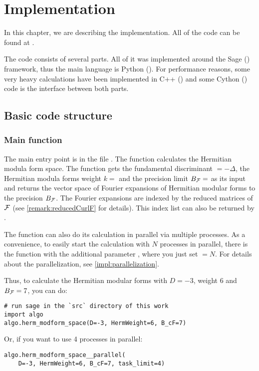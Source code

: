 
\section{Implementation}

In this chapter, we are describing the implementation. All of the code can be found at \cite{Zeyer13Github}.

The code consists of several parts.
All of it was implemented around the Sage (\cite{sage}) framework, thus the main language is Python (\cite{python}).
For performance reasons, some very heavy calculations have been implemented in C++ (\cite{cpp}) and some Cython (\cite{cython}) code is the interface between both parts.

\subsection{Basic code structure}

\subsubsection{Main function }
The main entry point is in the file .
The function  calculates the Hermitian modula form space.
The function gets the fundamental discriminant  $= - \Delta$, the Hermitian modula forms weight $k =$  and the precision limit $B_{\mathcal{F}} =$  as its input and returns the vector space of Fourier expansions of Hermitian modular forms to the precision $B_{\mathcal{F}}$. The Fourier expansions are indexed by the reduced matrices of $\mathcal{F}$ (see \cref{remark:reducedCurlF} for details). This index list can also be returned by .

The function can also do its calculation in parallel via multiple processes. As a convenience, to easily start the calculation with $N$ processes in parallel, there is the function  with the additional parameter , where you just set  $=N$. For details about the parallelization, see \cref{impl:parallelization}.

Thus, to calculate the Hermitian modular forms with $D=-3$, weight $6$ and $B_{\mathcal{F}} = 7$, you can do:
\begin{lstlisting}
# run sage in the `src` directory of this work
import algo
algo.herm_modform_space(D=-3, HermWeight=6, B_cF=7)
\end{lstlisting}
Or, if you want to use 4 processes in parallel:
\begin{lstlisting}
algo.herm_modform_space__parallel(
    D=-3, HermWeight=6, B_cF=7, task_limit=4)
\end{lstlisting}

